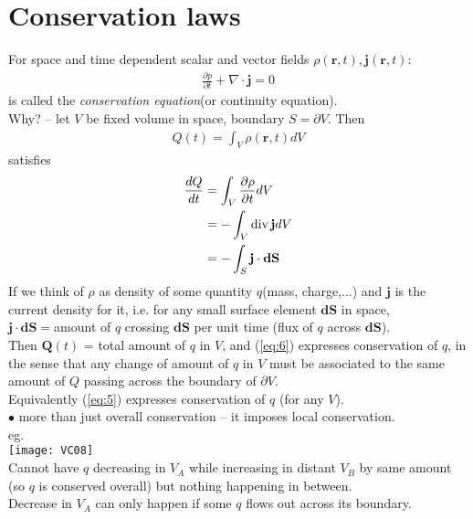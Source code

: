 \documentclass[a4paper]{article}
\begin{document}
\section{Conservation laws}
For space and time dependent scalar and vector fields $\rho\left(\mathbf{r},t\right),\mathbf{j}\left(\mathbf{r},t\right)$:
\begin{equation}\label{eq:5}
\begin{aligned}
\frac{\partial p}{\partial t}+\nabla\cdot\mathbf{j}=0
\end{aligned}
\end{equation}
is called the \emph{conservation equation}(or continuity equation).\\
Why? -- let $V$ be fixed volume in space, boundary $S=\partial V$. Then
\begin{equation*}
\begin{aligned}
Q\left(t\right)=\int_V \rho\left(\mathbf{r},t\right) dV
\end{aligned}
\end{equation*}
satisfies
\begin{equation}\label{eq:6}
\begin{aligned}
\frac{dQ}{dt}&=\int_V \frac{\partial \rho}{\partial t} dV\\
&= -\int_V \operatorname{div} \mathbf{j}dV\\
&= -\int_S \mathbf{j}\cdot\mathbf{dS}
\end{aligned}
\end{equation}
If we think of $\rho$ as density of some quantity $q$(mass, charge,...) and $\mathbf{j}$ is the current density for it, i.e. for any small surface element $\mathbf{dS}$ in space,\\
$\mathbf{j}\cdot\mathbf{dS}=$amount of $q$ crossing $\mathbf{dS}$ per unit time (flux of $q$ across $\mathbf{dS}$).\\
Then $\mathbf{Q}\left(t\right)$ = total amount of $q$ in $V$, and (\ref{eq:6}) expresses conservation of $q$, in the sense that any change of amount of $q$ in $V$ must be associated to the same amount of $Q$ passing across the boundary of $\partial V$.\\
Equivalently (\ref{eq:5}) expresses conservation of $q$ (for any $V$).\\
$\bullet$ more than just overall conservation -- it imposes local conservation.\\
eg.\\
\texttt{[image: VC08]}\\
Cannot have $q$ decreasing in $V_A$ while increasing in distant $V_B$ by same amount (so $q$ is conserved overall) but nothing happening in between.\\
Decrease in $V_A$ can only happen if some $q$ flows out across its boundary.\\
\end{document}
